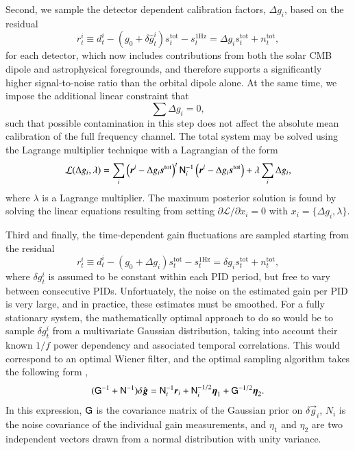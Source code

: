 \documentclass[onecolumn]{aa}
\newcommand{\s}[0]{\vec{s}}
\newcommand{\g}[0]{\vec{g}}
\newcommand{\N}[0]{\tens{N}}
\renewcommand{\r}[0]{\vec{r}}
\begin{document}
Second, we sample the detector dependent calibration factors, $\Delta
g_i$, based on the residual
\begin{equation}
  r^i_t \equiv d^i_{t} - (g_0 + \delta \hat{g}_t^i) s^{\mathrm{tot}}_{t}  - s^{\mathrm{1Hz}}_t
  =  \Delta g_i s^{\mathrm{tot}}_{t} + n^{\mathrm{tot}}_{t},
  \label{eq:g0_res}
\end{equation}
for each detector, which now includes contributions from both the
solar CMB dipole and astrophysical foregrounds, and therefore supports
a significantly higher signal-to-noise ratio than the orbital dipole
alone. At the same time, we impose the additional linear constraint that
\begin{equation}
  \sum \Delta g_i = 0,
\end{equation}
such that possible contamination in this step does not affect the
absolute mean calibration of the full frequency channel. The total
system may be solved using the Lagrange multiplier technique
\citep[e.g.,][]{bertsekas:1996} with a Lagrangian of the form
\begin{equation}
\mathcal{L}(\Delta g_i, \lambda) = \sum_i \left(\r^{i}-\Delta g_i
\s^{\mathrm{tot}}\right)^t \N_i^{-1} \left(\r^{i}-\Delta g_i \s^{\mathrm{tot}}\right) +
\lambda \sum_i \Delta g_i,
\end{equation}
where $\lambda$ is a Lagrange multiplier. The maximum posterior
solution is found by solving the linear equations resulting from setting
$\partial \mathcal{L}/\partial x_i = 0$ with $x_i = \{\Delta g_i,
\lambda\}$. 


Third and finally, the time-dependent gain fluctuations are sampled
starting from the residual 
\begin{equation}
  r^i_t \equiv d^i_{t} - \left(g_0 + \Delta g_i\right) s^{\mathrm{tot}}_{t} - s^{\mathrm{1Hz}}_t
 =  \delta g_i s^{\mathrm{tot}}_{t} + n^{\mathrm{tot}}_{t},
\end{equation}
where $\delta g^i_t$ is assumed to be constant within each PID period,
but free to vary between consecutive PIDs. Unfortuately, the noise on
the estimated gain per PID is very large, and in practice, these
estimates must be smoothed. For a fully stationary system, the
mathematically optimal approach to do so would be to sample $\delta
g^i_t$ from a multivariate Gaussian distribution, taking into account
their known $1/f$ power dependency and associated temporal
correlations. This would correspond to an optimal Wiener filter, and
the optimal sampling algorithm takes the following form \citep{bp07},
\newcommand{\tG}[0]{\tens{G}}
\begin{equation}
    (\tG^{-1} + \N^{-1})\delta \hat{\g} = \N_i^{-1}\r_i + \N_i^{-1/2}\vec\eta_1 + \tG^{-1/2}\vec\eta_2.
    \label{eq:delta_gain_sampling_with_prior}
\end{equation}
In this expression, $\tG$ is the covariance matrix of the Gaussian
prior on $\delta\g_i$, $N_i$ is the noise covariance of the individual
gain measurements, and $\eta_1$ and $\eta_2$ are two independent
vectors drawn from a normal distribution with unity
variance.
\end{document}
